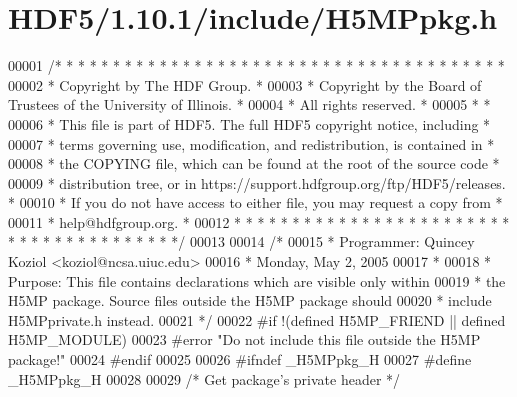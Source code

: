 \hypertarget{_h_d_f5_21_810_81_2include_2_h5_m_ppkg_8h_source}{}\section{H\+D\+F5/1.10.1/include/\+H5\+M\+Ppkg.h}
\label{_h_d_f5_21_810_81_2include_2_h5_m_ppkg_8h_source}

\begin{DoxyCode}
00001 \textcolor{comment}{/* * * * * * * * * * * * * * * * * * * * * * * * * * * * * * * * * * * * * * *}
00002 \textcolor{comment}{ * Copyright by The HDF Group.                                               *}
00003 \textcolor{comment}{ * Copyright by the Board of Trustees of the University of Illinois.         *}
00004 \textcolor{comment}{ * All rights reserved.                                                      *}
00005 \textcolor{comment}{ *                                                                           *}
00006 \textcolor{comment}{ * This file is part of HDF5.  The full HDF5 copyright notice, including     *}
00007 \textcolor{comment}{ * terms governing use, modification, and redistribution, is contained in    *}
00008 \textcolor{comment}{ * the COPYING file, which can be found at the root of the source code       *}
00009 \textcolor{comment}{ * distribution tree, or in https://support.hdfgroup.org/ftp/HDF5/releases.  *}
00010 \textcolor{comment}{ * If you do not have access to either file, you may request a copy from     *}
00011 \textcolor{comment}{ * help@hdfgroup.org.                                                        *}
00012 \textcolor{comment}{ * * * * * * * * * * * * * * * * * * * * * * * * * * * * * * * * * * * * * * */}
00013 
00014 \textcolor{comment}{/*}
00015 \textcolor{comment}{ * Programmer:  Quincey Koziol <koziol@ncsa.uiuc.edu>}
00016 \textcolor{comment}{ *      Monday, May  2, 2005}
00017 \textcolor{comment}{ *}
00018 \textcolor{comment}{ * Purpose: This file contains declarations which are visible only within}
00019 \textcolor{comment}{ *      the H5MP package.  Source files outside the H5MP package should}
00020 \textcolor{comment}{ *      include H5MPprivate.h instead.}
00021 \textcolor{comment}{ */}
00022 \textcolor{preprocessor}{#if !(defined H5MP\_FRIEND || defined H5MP\_MODULE)}
00023 \textcolor{preprocessor}{#error "Do not include this file outside the H5MP package!"}
00024 \textcolor{preprocessor}{#endif}
00025 
00026 \textcolor{preprocessor}{#ifndef \_H5MPpkg\_H}
00027 \textcolor{preprocessor}{#define \_H5MPpkg\_H}
00028 
00029 \textcolor{comment}{/* Get package's private header */}

\end{DoxyCode}
